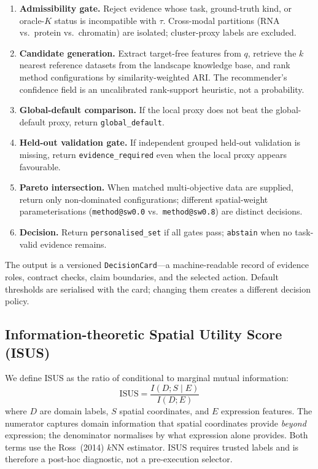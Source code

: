 \documentclass[]{bioinfo}
\begin{document}
\begin{enumerate}
  \item \textbf{Admissibility gate.} Reject evidence whose task, ground-truth
        kind, or oracle-\(K\) status is incompatible with \(\tau\).
        Cross-modal partitions (RNA vs.\ protein vs.\ chromatin) are
        isolated; cluster-proxy labels are excluded.
  \item \textbf{Candidate generation.} Extract target-free features from
        \(q\), retrieve the \(k\) nearest reference datasets from the
        landscape knowledge base, and rank method configurations by
        similarity-weighted ARI. The recommender's confidence field is an
        uncalibrated rank-support heuristic, not a probability.
  \item \textbf{Global-default comparison.} If the local proxy does not
        beat the global-default proxy, return \texttt{global\_default}.
  \item \textbf{Held-out validation gate.} If independent grouped held-out
        validation is missing, return \texttt{evidence\_required} even
        when the local proxy appears favourable.
  \item \textbf{Pareto intersection.} When matched multi-objective data are
        supplied, return only non-dominated configurations; different
        spatial-weight parameterisations (\texttt{method@sw0.0} vs.\
        \texttt{method@sw0.8}) are distinct decisions.
  \item \textbf{Decision.} Return \texttt{personalised\_set} if all gates
        pass; \texttt{abstain} when no task-valid evidence remains.
\end{enumerate}

The output is a versioned \texttt{DecisionCard}---a machine-readable
record of evidence roles, contract checks, claim boundaries, and the
selected action. Default thresholds are serialised with the card;
changing them creates a different decision policy.

\subsection{Information-theoretic Spatial Utility Score (ISUS)}

We define ISUS as the ratio of conditional to marginal mutual
information:
\begin{equation}
\text{ISUS} = \frac{I(D; S \mid E)}{I(D; E)}
\label{eq:isus}
\end{equation}
where \(D\) are domain labels, \(S\) spatial coordinates, and \(E\)
expression features. The numerator captures domain information that
spatial coordinates provide \emph{beyond} expression; the denominator
normalises by what expression alone provides. Both terms use the
Ross~(2014) \(k\)NN estimator. ISUS requires trusted labels and is
therefore a post-hoc diagnostic, not a pre-execution selector.
\end{document}
